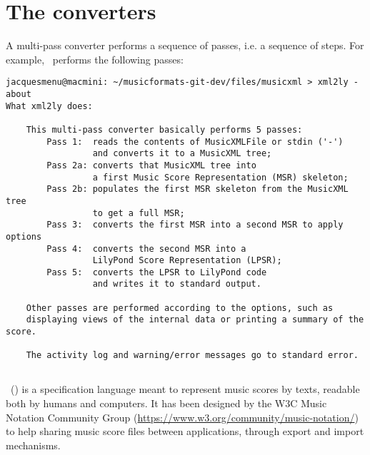 
\chapter{The converters}

A multi-pass converter performs a sequence of passes, i.e. a sequence of steps. For example, \xmlToLy\ performs the following passes:
\begin{lstlisting}[language=Terminal]
jacquesmenu@macmini: ~/musicformats-git-dev/files/musicxml > xml2ly -about
What xml2ly does:

    This multi-pass converter basically performs 5 passes:
        Pass 1:  reads the contents of MusicXMLFile or stdin ('-')
                 and converts it to a MusicXML tree;
        Pass 2a: converts that MusicXML tree into
                 a first Music Score Representation (MSR) skeleton;
        Pass 2b: populates the first MSR skeleton from the MusicXML tree
                 to get a full MSR;
        Pass 3:  converts the first MSR into a second MSR to apply options
        Pass 4:  converts the second MSR into a
                 LilyPond Score Representation (LPSR);
        Pass 5:  converts the LPSR to LilyPond code
                 and writes it to standard output.

    Other passes are performed according to the options, such as
    displaying views of the internal data or printing a summary of the score.

    The activity log and warning/error messages go to standard error.
\end{lstlisting}


\section{\xmlToLy}

\mxml\ () is a specification language meant to represent music scores by texts, readable both by humans and computers. It has been designed by the W3C Music Notation Community Group (\url{https://www.w3.org/community/music-notation/}) to help sharing music score files between applications, through export and import mechanisms.

